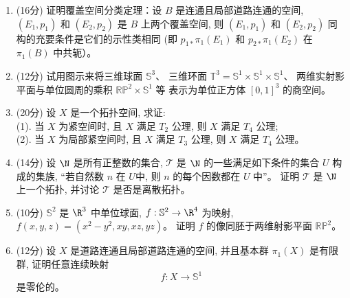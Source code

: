 \begin{enumerate}
\item[二、](16分) 证明覆盖空间分类定理：设 $B$ 是连通且局部道路连通的空间, 
$(E_{1}, p_{1})$ 和 $(E_{2}, p_{2})$ 是 $B$ 上两个覆盖空间, 
则 $(E_{1}, p_{1})$ 和 $(E_{2}, p_{2})$ 同构的充要条件是它们的示性类相同 
(即 $p_{1 *} \pi_{1}(E_{1})$ 和 $p_{2 *} \pi_{1}(E_{2})$ 在 $\pi_{1}(B)$ 中共轭）。

\item[三、](12分) 试用图示来将三维球面 $\mathbb{S}^{3}$、
三维环面 $\mathbb{T}^{3}=\mathbb{S}^{1} \times \mathbb{S}^{1} \times \mathbb{S}^{1}$、
两维实射影平面与单位圆周的乘积 $\mathbb{RP}^{2} \times \mathbb{S}^{1}$ 等
表示为单位正方体 $[0,1]^{3}$ 的商空间。

\item[四、](20分) 设 $X$ 是一个拓扑空间, 求证:\\
(1). 当 $X$ 为紧空间时, 且 $X$ 满足 $T_{2}$ 公理, 则 $X$ 满足 $T_{4}$ 公理;\\
(2). 当 $X$ 为局部紧空间时, 且 $X$ 满足 $T_{3}$ 公理, 则 $X$ 满足 $T_{4}$ 公理。

\item[五、](14分) 设 $\N$ 是所有正整数的集合, 
$\mathcal{T}$ 是 $\N$ 的一些满足如下条件的集合 $U$ 构成的集族, 
``若自然数 $n$ 在 $U$中, 则 $n$ 的每个因数都在 $U$ 中''。
证明 $\mathcal{T}$ 是 $\N$ 上一个拓扑, 并讨论 $\mathcal{T}$ 是否是离散拓扑。

\item[六、](10分) $\mathbb{S}^{2}$ 是 $\R^{3}$ 中单位球面, 
$f: \mathbb{S}^{2} \rightarrow \R^{4}$ 为映射, 
$f(x, y, z)=(x^{2}-y^{2}, xy, xz, yz)$。
证明 $f$ 的像同胚于两维射影平面 $\mathbb{RP}^{2}$。

\item[七、](12分) 设 $X$ 是道路连通且局部道路连通的空间, 
并且基本群 $\pi_{1}(X)$ 是有限群, 证明任意连续映射
$$f: X \rightarrow \mathbb{S}^{1}$$
是零伦的。
\end{enumerate}